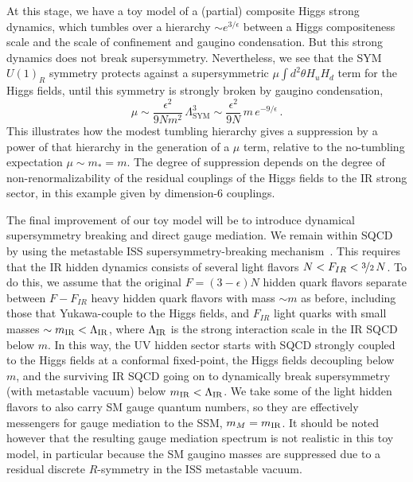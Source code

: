 \documentclass[a4paper,12pt]{article}
\def\mst{m_*}
\begin{document}
At this stage, we have a toy model of a (partial) composite Higgs strong dynamics, which tumbles over a hierarchy $\sim e^{3/\epsilon}$ between a Higgs compositeness scale and the scale of confinement and gaugino condensation. But this strong dynamics does not break supersymmetry. Nevertheless, we see that the SYM $U(1)_R$ symmetry  protects against a supersymmetric $\mu \int d^2 \theta {H}_u {H}_d$ term for the Higgs fields, until this symmetry is strongly broken by gaugino condensation,
\begin{equation}
\mu \sim   \frac{ \epsilon^2}{9 N m^2} \, \Lambda_{\textrm{SYM}}^3 \sim
\frac{ \epsilon^2}{9 N} \, m\, e^{- 9/\epsilon}\, .
\end{equation}
This illustrates how the modest tumbling hierarchy gives a suppression by a power of that hierarchy in the generation of a $\mu$ term, relative to the no-tumbling expectation $\mu \sim \mst = m$. The
degree of suppression depends on the degree of non-renormalizability of the residual couplings of the Higgs fields to the IR strong sector, in this example given by dimension-$6$ couplings.

The final improvement of our toy model will be to introduce dynamical supersymmetry breaking and direct gauge mediation. We remain within SQCD by using the metastable ISS supersymmetry-breaking mechanism~\cite{Intriligator:2006dd}. This requires that the IR hidden dynamics consists of several light flavors $N < F_{IR} < \nicefrac{3}{2}\, N$. To do this, we assume that the original $F = (3 - \epsilon) N$ hidden quark flavors separate between
$F - F_{IR}$ heavy hidden quark flavors with mass $\sim m$ as before, including those that Yukawa-couple to the Higgs fields, and $F_{IR}$ light quarks with small masses $\sim m_{\rm IR} < \Lambda_{\rm IR}$, where $\Lambda_{\rm IR}$ is the strong interaction scale in the IR SQCD below $m$. In this way, the UV hidden sector starts with SQCD strongly coupled to the Higgs fields at a conformal fixed-point, the Higgs fields decoupling below $m$, and the surviving IR SQCD going on to dynamically break supersymmetry (with metastable vacuum) below $m_{\rm IR} < \Lambda_{\rm IR}$. We take some of the light hidden flavors to also carry SM gauge quantum numbers, so they are effectively messengers for gauge mediation to the SSM, $m_M = m_{\rm IR}$. It should be noted however that the resulting gauge mediation spectrum is not realistic in this toy model, in particular because the SM gaugino masses are suppressed due to a residual discrete $R$-symmetry in the ISS metastable vacuum.
\end{document}
